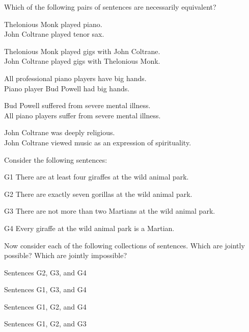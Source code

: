 \problempart Which of the following pairs of sentences are necessarily equivalent? 

\begin{compactlist}
\item  Thelonious Monk played piano.	\\
	John Coltrane played tenor sax.
\item  Thelonious Monk played gigs with John Coltrane.	\\
	John Coltrane played gigs with Thelonious Monk.
\item  All professional piano players have big hands.	\\
	Piano player Bud Powell had big hands.
\item  Bud Powell suffered from severe mental illness.	 \\
	All piano players suffer from severe mental illness.
\item John Coltrane was deeply religious.	 \\
John Coltrane viewed music as an expression of spirituality.
\end{compactlist}

\noindent
\problempart 
\label{pr.MartianGiraffes}
Consider the following sentences: 
\begin{compactlist}%
\item[G1] \label{itm:at_least_four}There are at least four giraffes at the wild animal park.
\item[G2] \label{itm:exactly_seven} There are exactly seven gorillas at the wild animal park.
\item[G3] \label{itm:not_more_than_two} There are not more than two Martians at the wild animal park.
\item[G4] \label{itm:martians} Every giraffe at the wild animal park is a Martian.
\end{compactlist}

Now consider each of the following collections of sentences. Which are jointly possible? Which are jointly impossible?
\begin{compactlist}
\item Sentences G2, G3, and G4
\hfill {}
\item Sentences G1, G3, and G4
\hfill {}
\item Sentences G1, G2, and G4
\hfill {}
\item Sentences G1, G2, and G3
\hfill {}
\end{compactlist}

